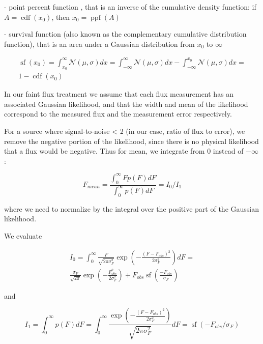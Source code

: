 \documentclass[fleqn,usenatbib]{mnras}  %
\DeclareMathOperator\cdf{cdf}
\DeclareMathOperator\sf{sf}
\DeclareMathOperator\ppf{ppf}
\begin{document}
- point percent function , that is an inverse of the cumulative density function:  if  $A = \cdf(x_{0})$, then  $x_{0} = \ppf(A)$

- survival function (also known  as the complementary cumulative distribution function), that is an area under a Gaussian distribution from $x_{0}$ to $\infty$

\begin{multline}
\sf(x_{0}) =  \int_{x_{0}}^{\infty}{\mathcal{N}(\mu,\sigma)dx} =  \int_{-\infty}^{\infty}{\mathcal{N}(\mu,\sigma)dx} -  \int_{-\infty}^{x_{0}}{\mathcal{N}(\mu,\sigma)dx} = \\
1 - \cdf(x_{0})
\end{multline}

In our faint flux treatment  we assume that each flux measurement has an associated Gaussian likelihood, and that the width and mean of the likelihood correspond 
to the measured flux and the measurement error respectively. 

For a source where signal-to-noise < 2 (in our case, ratio of  flux to error), we remove the negative portion of the likelihood, since there is no physical likelihood that a flux would be negative.
Thus for mean, we integrate from $0$ instead of $-\infty$ : 


\begin{equation}
F_{mean} = \frac{\int _{0} ^ {\infty}{F p(F) dF}}{\int _{0} ^ {\infty}{p(F) dF}} = I_{0} / I_{1}
\end{equation}

where we need to normalize by the integral over the positive part of the Gaussian likelihood. 

We evaluate 

\begin{multline}
I_{0}= \int _{0} ^ {\infty} {\frac{F}{\sqrt{2\pi\sigma_{F}^{2}}} \exp{\left(-\frac{(F-F_{obs})^{2}}{2\sigma_{F}^{2}}\right)} }dF = \\  \frac{\sigma_{F}}{\sqrt{2 \pi}} \exp{\left(- \frac{F_{obs}^{2}}{2\sigma_{F}^{2}} \right)} + F_{obs} \sf{\left( \frac{-F_{obs}}{\sigma_{F}}\right)}
\end{multline}

and 

\begin{equation}
I_{1} = \int _{0} ^ {\infty}{ p(F) dF} = \int _{0} ^ {\infty} {\frac{\exp{\left(-\frac{(F-F_{obs})^{2}}{2\sigma_{F}^{2}}\right)} }{\sqrt{2\pi\sigma_{F}^{2}}} }dF = \sf{(-F_{obs} / \sigma_{F})}
\end{equation}
\end{document}
